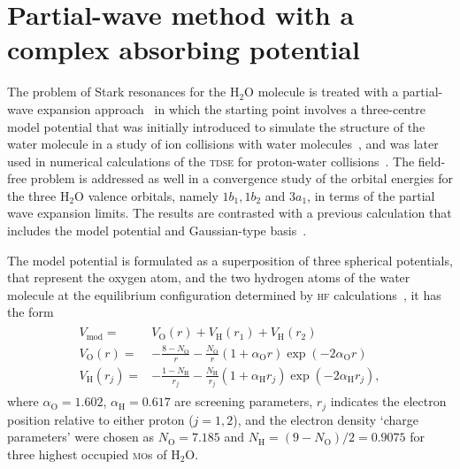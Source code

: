 \section{Partial-wave method with a complex absorbing potential}
\label{ch:partial_wave}




The problem of Stark resonances for the H$_{2}$O molecule is treated
with a partial-wave expansion approach~\cite{marko_partialwave} in
which the starting point involves a three-centre model potential that
was initially introduced to simulate the structure of the water
molecule in a study of ion collisions with water
molecules~\cite{illescas_modelV_2011}, and was later used in numerical
calculations of the \textsc{tdse} for proton-water
collisions~\cite{illescas_2015}. The field-free problem is addressed
as well in a convergence study of the orbital energies for the three
H$_{2}$O valence orbitals, namely $1b_{1}, 1b_{2}$ and $3a_{1}$, in
terms of the partial wave expansion limits. The results are contrasted
with a previous calculation that includes the model potential and
Gaussian-type basis~\cite{illescas_2015}.

The model potential is formulated as a superposition of three
spherical potentials, that represent the oxygen atom, and the two
hydrogen atoms of the water molecule at the equilibrium configuration
determined by \textsc{hf} calculations~\cite{illescas_2015}, it has
the form
%
\begin{eqnarray}
  \begin{split}
    V_{\mathrm{mod}} = & V_{\mathrm{O}}(r) + V_{\mathrm{H}}(r_{1}) 
    + V_{\mathrm{H}}(r_{2}) \\
    V_{\mathrm{O}}(r) = & -\frac{8 - N_{\mathrm{O}}}{r} -
    \frac{N_{\mathrm{O}}}{r}(1 + \alpha_{\mathrm{O}}r) \exp(-2\alpha_{\mathrm{O}}r) \\
    V_{\mathrm{H}}(r_{j}) = & -\frac{1 - N_{\mathrm{H}}}{r_{j}} -
    \frac{N_{\mathrm{H}}}{r_{j}}(1 + \alpha_{\mathrm{H}}r_{j}) \exp(-2\alpha_{\mathrm{H}}r_{j}),
  \end{split}
  \label{eq:model_potential}
\end{eqnarray}
%
where $\alpha_{\mathrm{O}} = 1.602$, $\alpha_{\mathrm{H}} = 0.617$ are
screening parameters, $r_{j}$ indicates the electron position relative
to either proton ($j=1,2$), and the electron density `charge
parameters' were chosen as $N_{\mathrm{O}} = 7.185$ and
$N_{\mathrm{H}} = (9 - N_{\mathrm{O}})/2 = 0.9075$ for three highest
occupied \textsc{mo}s of H$_{2}$O. 

